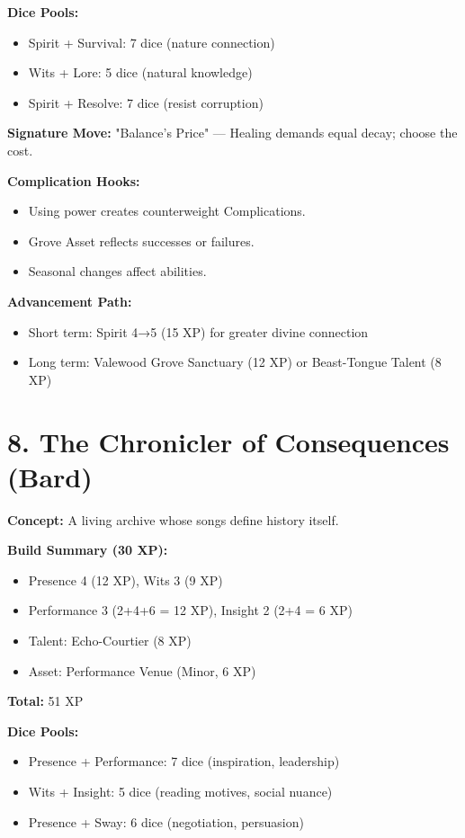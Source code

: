 \textbf{Dice Pools:}
\begin{itemize}
  \item Spirit + Survival: 7 dice (nature connection)
  \item Wits + Lore: 5 dice (natural knowledge)
  \item Spirit + Resolve: 7 dice (resist corruption)
\end{itemize}

\textbf{Signature Move:} "Balance's Price" — Healing demands equal decay; choose the cost.

\textbf{Complication Hooks:}
\begin{itemize}
  \item Using power creates counterweight Complications.
  \item Grove Asset reflects successes or failures.
  \item Seasonal changes affect abilities.
\end{itemize}

\textbf{Advancement Path:}
\begin{itemize}
  \item Short term: Spirit 4→5 (15 XP) for greater divine connection
  \item Long term: Valewood Grove Sanctuary (12 XP) or Beast-Tongue Talent (8 XP)
\end{itemize}

\section{8. The Chronicler of Consequences (Bard)}

\textbf{Concept:} A living archive whose songs define history itself.

\textbf{Build Summary (30 XP):}
\begin{itemize}
  \item Presence 4 (12 XP), Wits 3 (9 XP)
  \item Performance 3 (2+4+6 = 12 XP), Insight 2 (2+4 = 6 XP)
  \item Talent: Echo-Courtier (8 XP)
  \item Asset: Performance Venue (Minor, 6 XP)
\end{itemize}
\textbf{Total:} 51 XP

\textbf{Dice Pools:}
\begin{itemize}
  \item Presence + Performance: 7 dice (inspiration, leadership)
  \item Wits + Insight: 5 dice (reading motives, social nuance)
  \item Presence + Sway: 6 dice (negotiation, persuasion)
\end{itemize}

